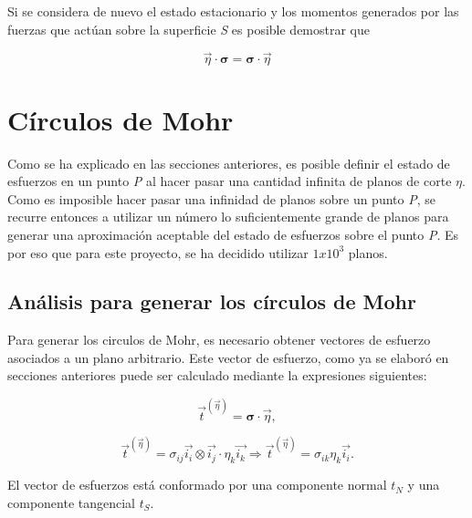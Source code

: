 \documentclass{article}
\begin{document}
    Si se considera de nuevo el estado estacionario y los momentos generados por las fuerzas
    que act\'{u}an sobre la superficie \textit{S} es posible demostrar que

    \begin{equation}
        \vec{\eta}\cdot\bm{\sigma} = \bm{\sigma}\cdot\vec{\eta}
    \end{equation}


    \section{Círculos de Mohr}
    Como se ha explicado en las secciones anteriores, es posible definir el estado de esfuerzos
    en un punto \textit{P} al hacer pasar una cantidad infinita de planos de corte $\eta$.
    Como es imposible hacer pasar una infinidad de planos sobre un punto \textit{P}, se recurre
    entonces a utilizar un n\'{u}mero lo suficientemente grande de planos para generar una
    aproximaci\'{o}n aceptable del estado de esfuerzos sobre el punto \textit{P}. Es por eso
    que para este proyecto, se ha decidido utilizar $1x10^3$ planos.

    \subsection{An\'{a}lisis para generar los círculos de Mohr}
    
    Para generar los circulos de Mohr, es necesario obtener vectores de esfuerzo asociados a
    un plano arbitrario. Este vector de esfuerzo, como ya se elabor\'{o} en secciones
    anteriores puede ser calculado mediante la expresiones siguientes:
    
    \begin{equation}
        \vec{t}^{(\vec{\eta})} = \bm{\sigma} \cdot \vec{\eta},
    \end{equation}

    \begin{equation}
        \vec{t}^{(\vec{\eta})} = \sigma_{ij}\vec{i_{i}}\otimes\vec{i_{j}}\cdot\eta_{k}\vec{i_{k}}
        \Longrightarrow
        \vec{t}^{(\vec{\eta})} = \sigma_{ik}\eta_{k}\vec{i_{i}}.
    \end{equation}

    El vector de esfuerzos est\'{a} conformado por una componente normal $t_{N}$ y una
    componente tangencial $t_{S}$. 
    
\end{document}
